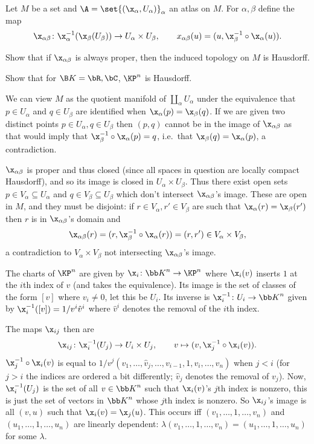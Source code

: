 \def\bK{{\bb K}}

\bprob

    Let $M$ be a set and $\A=\set{(\x_\alpha,U_\alpha)}_\alpha$ an atlas on $M$.
    For $\alpha,\beta$ define the map
    $$ \x_{\alpha\beta}\colon\x^{-1}_\alpha(\x_\beta(U_\beta)) \to U_\alpha\times U_\beta,\qquad x_{\alpha\beta}(u) = (u,\x_\beta^{-1}\circ\x_\alpha(u)) . $$
    \benum
        \item Show that if $\x_{\alpha\beta}$ is always proper, then the induced topology on $M$ is Hausdorff.
        \item Show that for $\B K=\bR,\bC$, $\KP^n$ is Hausdorff.
    \eenum

\eprob

\benum
    \def\y{{\bf y}}
    \item We can view $M$ as the quotient manifold of $\coprod_\alpha U_\alpha$ under the equivalence that $p\in U_\alpha$ and $q\in U_\beta$ are identified
    when $\x_\alpha(p)=\x_\beta(q)$.
    If we are given two distinct points $p\in U_\alpha,q\in U_\beta$ then $(p,q)$ cannot be in the image of $\x_{\alpha\beta}$ as that would imply that
    $\x_\beta^{-1}\circ\x_\alpha(p)=q$, i.e.\ that $\x_\beta(q)=\x_\alpha(p)$, a contradiction.

    $\x_{\alpha\beta}$ is proper and thus closed (since all spaces in question are locally compact Hausdorff), and so its image is closed in $U_\alpha\times U_\beta$.
    Thus there exist open sets $p\in V_\alpha\subseteq U_\alpha$ and $q\in V_\beta\subseteq U_\beta$ which don't intersect $\x_{\alpha\beta}$'s image.
    These are open in $M$, and they must be disjoint: if $r\in V_\alpha,r'\in V_\beta$ are such that $\x_\alpha(r)=\x_\beta(r')$ then $r$ is in $\x_{\alpha\beta}$'s domain
    and
    $$ \x_{\alpha\beta}(r) = (r,\x_\beta^{-1}\circ\x_\alpha(r)) = (r,r') \in V_\alpha\times V_\beta, $$
    a contradiction to $V_\alpha\times V_\beta$ not intersecting $\x_{\alpha\beta}$'s image.

    \item The charts of $\KP^n$ are given by $\x_i\colon\bK^n\to\KP^n$ where $\x_i(v)$ inserts $1$ at the $i$th index of $v$ (and takes the equivalence).
    Its image is the set of classes of the form $[v]$ where $v_i\neq0$, let this be $U_i$.
    Its inverse is $\x_i^{-1}\colon U_i\to\bK^n$ given by $\x_i^{-1}([v])=1/v^i\hat v^i$ where $\hat v^i$ denotes the removal of the $i$th index.

    The maps $\x_{ij}$ then are
    $$ \x_{ij}\colon\x^{-1}_i(U_j) \to U_i\times U_j,\qquad v \mapsto (v,\x_j^{-1}\circ\x_i(v)) . $$
    $\x_j^{-1}\circ\x_i(v)$ is equal to $1/v^j(v_1,\dots,\hat v_j,\dots,v_{i-1},1,v_i,\dots,v_n)$ when $j<i$ (for $j>i$ the indices are ordered a bit differently; $\hat v_j$ denotes
    the removal of $v_j$).
    Now, $\x^{-1}_i(U_j)$ is the set of all $v\in\bK^n$ such that $\x_i(v)$'s $j$th index is nonzero, this is just the set of vectors in $\bK^n$ whose $j$th index is nonzero.
    So $\x_{ij}$'s image is all $(v,u)$ such that $\x_i(v)=\x_j(u)$.
    This occurs iff $(v_1,\dots,1,\dots,v_n)$ and $(u_1,\dots,1,\dots,u_n)$ are linearly dependent: $\lambda(v_1,\dots,1,\dots,v_n)=(u_1,\dots,1,\dots,u_n)$ for some $\lambda$.

